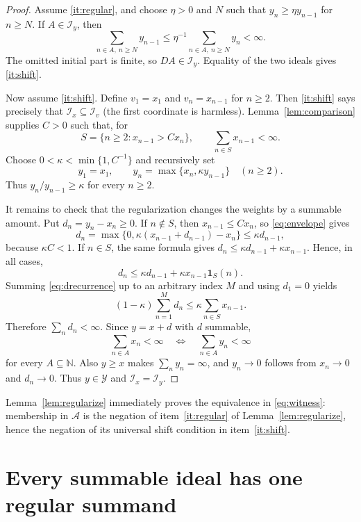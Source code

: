 \documentclass[11pt]{article}
\newcommand{\N}{\mathbb N}
\newcommand{\Ix}[1]{\mathcal I_{#1}}
\newcommand{\cA}{\mathscr A}
\newcommand{\cY}{\mathscr Y}
\begin{document}
\begin{proof}
Assume \ref{it:regular}, and choose $\eta>0$ and $N$ such that
$y_n\geq\eta y_{n-1}$ for $n\geq N$.  If $A\in\Ix{y}$, then
\[
 \sum_{n\in A,\ n\geq N}y_{n-1}
 \leq\eta^{-1}\sum_{n\in A,\ n\geq N}y_n<\infty.
\]
The omitted initial part is finite, so $DA\in\Ix{y}$.  Equality of the two
ideals gives \ref{it:shift}.

Now assume \ref{it:shift}.  Define $v_1=x_1$ and $v_n=x_{n-1}$ for $n\ge2$.
Then \ref{it:shift} says precisely that $\Ix{x}\subseteq\Ix{v}$ (the first
coordinate is harmless).  Lemma~\ref{lem:comparison} supplies $C>0$ such
that, for
\[
 S=\{n\ge2:x_{n-1}>Cx_n\},
 \qquad \sum_{n\in S}x_{n-1}<\infty.
\]
Choose $0<\kappa<\min\{1,C^{-1}\}$ and recursively set
\begin{equation}\label{eq:envelope}
 y_1=x_1,
 \qquad y_n=\max\{x_n,\kappa y_{n-1}\}\quad(n\ge2).
\end{equation}
Thus $y_n/y_{n-1}\geq\kappa$ for every $n\ge2$.

It remains to check that the regularization changes the weights by a
summable amount.  Put $d_n=y_n-x_n\geq0$.  If $n\notin S$, then
$x_{n-1}\leq Cx_n$, so \eqref{eq:envelope} gives
\[
 d_n
 =\max\{0,\kappa(x_{n-1}+d_{n-1})-x_n\}
 \leq\kappa d_{n-1},
\]
because $\kappa C<1$.  If $n\in S$, the same formula gives
$d_n\leq\kappa d_{n-1}+\kappa x_{n-1}$.  Hence, in all cases,
\begin{equation}\label{eq:drecurrence}
 d_n\leq\kappa d_{n-1}+\kappa x_{n-1}\mathbf1_S(n).
\end{equation}
Summing \eqref{eq:drecurrence} up to an arbitrary index $M$ and using
$d_1=0$ yields
\[
 (1-\kappa)\sum_{n=1}^M d_n
 \leq\kappa\sum_{n\in S}x_{n-1}.
\]
Therefore $\sum_nd_n<\infty$.  Since $y=x+d$ with $d$ summable,
\[
 \sum_{n\in A}x_n<\infty
 \quad\Longleftrightarrow\quad
 \sum_{n\in A}y_n<\infty
\]
for every $A\subseteq\N$.  Also $y\geq x$ makes $\sum_ny_n=\infty$, and
$y_n\to0$ follows from $x_n\to0$ and $d_n\to0$.  Thus $y\in\cY$ and
$\Ix{x}=\Ix{y}$.
\end{proof}

Lemma~\ref{lem:regularize} immediately proves the equivalence in
\eqref{eq:witness}: membership in $\cA$ is the negation of
item~\ref{it:regular} of Lemma~\ref{lem:regularize}, hence the negation of its
universal shift condition in item~\ref{it:shift}.

\section{Every summable ideal has one regular summand}
\end{document}
